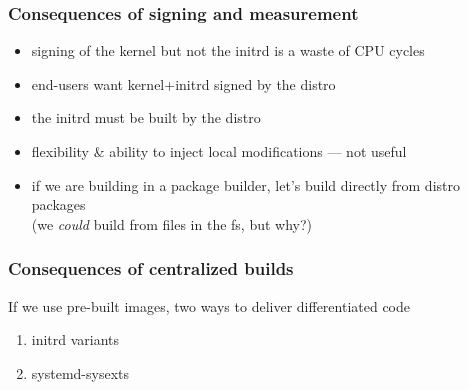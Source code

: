 \documentclass[]{beamer}
\newcommand\pp\pause
\begin{document}
\begin{frame}
  \frametitle{Consequences of signing and measurement}

  \pp
  \begin{itemize}
  \item signing of the kernel but not the initrd is a waste of CPU cycles \pause\\
  \item end-users want kernel+initrd signed by the distro \pause\\
  \item the initrd must be built by the distro \pause\\
  \item flexibility \& ability to inject local modifications — not useful \pause\\

    \quad

  \item if we are building in a package builder, let's build directly from distro packages\\
    (we \textit{could} build from files in the fs, but why?)
  \end{itemize}
\end{frame}

\begin{frame}
  \frametitle{Consequences of centralized builds}

  If we use pre-built images, two ways to deliver differentiated code
  \pause

  \begin{enumerate}
  \item initrd variants\pause
  \item systemd-sysexts
  \end{enumerate}
\end{frame}




\end{document}
